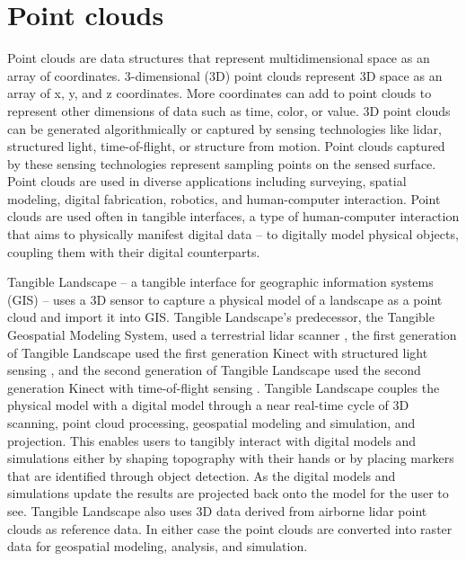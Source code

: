 \documentclass{article}
\begin{document}

\section{Point clouds}
Point clouds are data structures that represent multidimensional space as an array of coordinates. 
%
3-dimensional (3D) point clouds represent 3D space as an array of x, y, and z coordinates. 
%
More coordinates can add to point clouds to represent other dimensions of data such as time, color, or value. 
%
3D point clouds can be generated algorithmically or captured by sensing technologies like lidar, structured light, time-of-flight, or structure from motion. 
%
Point clouds captured by these sensing technologies represent sampling points on the sensed surface. 
%
Point clouds are used in diverse applications including
surveying,
spatial modeling, 
digital fabrication, robotics, and
human-computer interaction. 
%
Point clouds are used often in tangible interfaces, 
a type of human-computer interaction that aims to physically manifest digital data --
to digitally model physical objects, coupling them with their digital counterparts. 

Tangible Landscape -- a tangible interface for geographic information systems (GIS) -- 
uses a 3D sensor to capture a physical model of a landscape as a point cloud and import it into GIS.
%
Tangible Landscape's predecessor, the Tangible Geospatial Modeling System, used a terrestrial lidar scanner \citep{Tateosian2010},
the first generation of Tangible Landscape used the first generation Kinect with structured light sensing \citep{Petrasova2014}, 
and the second generation of Tangible Landscape used the second generation Kinect with time-of-flight sensing \citep{Petrasova2015}. 
%
Tangible Landscape couples the physical model with a digital model through a near real-time cycle of 
3D scanning, point cloud processing, geospatial modeling and simulation, and projection. 
%
This enables users to tangibly interact with digital models and simulations
either by shaping topography with their hands or 
by placing markers that are identified through object detection. 
%
As the digital models and simulations update
the results are projected back onto the model for the user to see. 
%
Tangible Landscape also uses 3D data derived from airborne lidar point clouds as reference data. 
%
In either case the point clouds are converted into raster data for geospatial modeling, analysis, and simulation.
\end{document}
